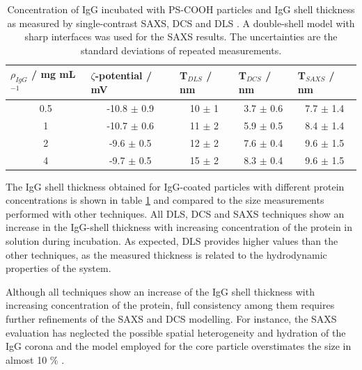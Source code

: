 \begin{table}[]
\centering
\caption{Concentration of IgG incubated with PS-COOH particles and IgG shell thickness as measured by single-contrast SAXS, DCS and DLS \cite{minelli_characterization_2014}. A double-shell model with sharp interfaces was used for the SAXS results. The uncertainties are the standard deviations of repeated measurements.}
\label{tab:CoatedKiskerSingleContrast}
\begin{tabular}{|c|c|c|c|c|}
\hline
\multicolumn{1}{|l|}{\textbf{$\rho_{IgG}$ / mg mL$^{-1}$ }} & \multicolumn{1}{l|}{\textbf{$\zeta$-potential / mV}} & \multicolumn{1}{l|}{\textbf{T$_{DLS}$ / nm}} & \multicolumn{1}{l|}{\textbf{T$_{DCS}$ / nm}} & \multicolumn{1}{l|}{\textbf{T$_{SAXS}$ / nm}} \\ \hline
0.5                     & -10.8 $\pm$ 0.9                  & 10 $\pm$ 1              & 3.7 $\pm$ 0.6                                & 7.7 $\pm$ 1.4                                 \\ \hline
1                        & -10.7 $\pm$ 0.6                  & 11 $\pm$ 2              & 5.9 $\pm$ 0.5                                & 8.4 $\pm$ 1.4                                 \\ \hline
2                         & -9.6 $\pm$ 0.5                   & 12 $\pm$ 2              & 7.6 $\pm$ 0.4                                & 9.6 $\pm$ 1.5                                 \\ \hline
4                        & -9.7 $\pm$ 0.5                   & 15 $\pm$ 2              & 8.3 $\pm$ 0.4                                & 9.6 $\pm$ 1.5                                 \\ \hline
\end{tabular}
\end{table}

The IgG shell thickness obtained for IgG-coated particles with different protein concentrations is shown in table \ref{tab:CoatedKiskerSingleContrast} and compared to the size measurements performed with other techniques. All DLS, DCS and SAXS techniques show an increase in the IgG-shell thickness with increasing concentration of the protein in solution during incubation. As expected, DLS provides higher values than the other techniques, as the measured thickness is related to the hydrodynamic properties of the system.

Although all techniques show an increase of the IgG shell thickness with increasing concentration of the protein, full consistency among them requires further refinements of the SAXS and DCS modelling. For instance, the SAXS evaluation has neglected the possible spatial heterogeneity and hydration of the IgG corona and the model employed for the core particle overstimates the size in almost 10 $\%$ \cite{minelli_characterization_2014, garcia-diez_nanoparticle_2015}.

